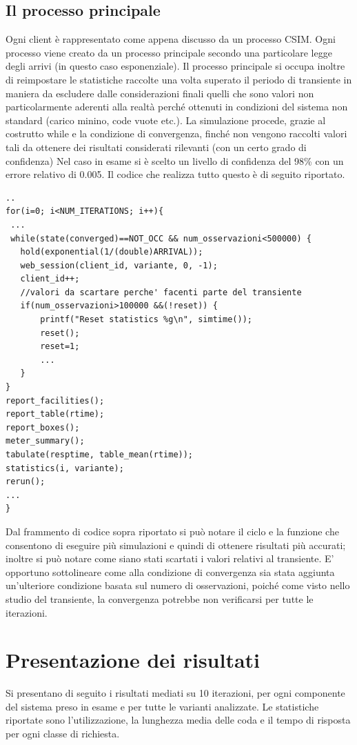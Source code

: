 \subsection{Il processo principale}
Ogni client è rappresentato come appena discusso da un processo CSIM. Ogni processo viene 
creato da un processo principale secondo una particolare legge degli arrivi (in questo caso 
esponenziale). Il processo principale si occupa inoltre di reimpostare le statistiche raccolte una volta 
superato il periodo di transiente in maniera da escludere dalle considerazioni finali quelli che sono valori non particolarmente aderenti alla realtà perché ottenuti in condizioni del sistema non standard (carico minino, code vuote etc.). 
La simulazione procede, grazie al costrutto while e la condizione di convergenza, finché non 
vengono raccolti valori tali da ottenere dei risultati considerati rilevanti (con un certo grado di confidenza) Nel caso in esame si è scelto un livello di confidenza del 98\% con un errore relativo  di 0.005.
Il codice che realizza tutto questo è di seguito riportato. 
\begin{lstlisting}
..
for(i=0; i<NUM_ITERATIONS; i++){
 ...
 while(state(converged)==NOT_OCC && num_osservazioni<500000) { 
   hold(exponential(1/(double)ARRIVAL)); 
   web_session(client_id, variante, 0, -1); 
   client_id++; 
   //valori da scartare perche' facenti parte del transiente
   if(num_osservazioni>100000 &&(!reset)) { 
       printf("Reset statistics %g\n", simtime()); 
       reset(); 
       reset=1; 
       ...
   } 
} 
report_facilities(); 
report_table(rtime); 
report_boxes(); 
meter_summary(); 
tabulate(resptime, table_mean(rtime)); 
statistics(i, variante); 
rerun();
...
}
\end{lstlisting}
Dal frammento di codice sopra riportato si può notare il ciclo  e la funzione  che consentono di eseguire più simulazioni e quindi di ottenere risultati più accurati; inoltre si può notare come siano stati scartati i valori relativi al transiente. E' opportuno sottolineare come alla condizione di convergenza sia stata aggiunta un'ulteriore condizione basata sul numero di osservazioni, poiché come visto nello studio del transiente, la convergenza potrebbe non verificarsi per tutte le iterazioni.

\section{Presentazione dei risultati}
Si presentano di seguito i risultati mediati su 10 iterazioni, per ogni componente del sistema preso in esame e per tutte le varianti analizzate. Le statistiche riportate sono l'utilizzazione, la lunghezza media delle coda e il tempo di risposta per ogni classe di richiesta.
